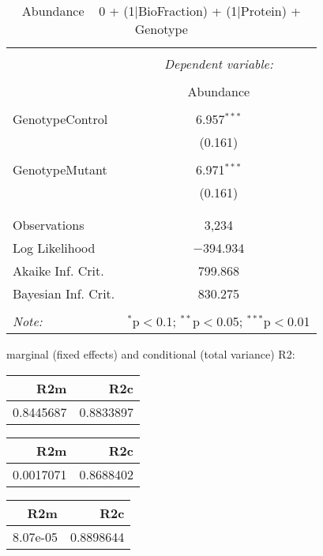 \documentclass[11pt]{report}
\begin{document}
\begin{table}[!htbp] \centering 
  \caption{Abundance ~ 0 + (1|BioFraction) + (1|Protein) + Genotype} 
  \label{} 
\begin{tabular}{@{\extracolsep{5pt}}lc} 
\\[-1.8ex]\hline 
\hline \\[-1.8ex] 
 & \multicolumn{1}{c}{\textit{Dependent variable:}} \\ 
\cline{2-2} 
\\[-1.8ex] & Abundance \\ 
\hline \\[-1.8ex] 
 GenotypeControl & 6.957$^{***}$ \\ 
  & (0.161) \\ 
  & \\ 
 GenotypeMutant & 6.971$^{***}$ \\ 
  & (0.161) \\ 
  & \\ 
\hline \\[-1.8ex] 
Observations & 3,234 \\ 
Log Likelihood & $-$394.934 \\ 
Akaike Inf. Crit. & 799.868 \\ 
Bayesian Inf. Crit. & 830.275 \\ 
\hline 
\hline \\[-1.8ex] 
\textit{Note:}  & \multicolumn{1}{r}{$^{*}$p$<$0.1; $^{**}$p$<$0.05; $^{***}$p$<$0.01} \\ 
\end{tabular} 
\end{table} 
marginal (fixed effects) and conditional (total variance) R2:

\begin{tabular}{r|r}
\hline
R2m & R2c\\
\hline
0.8445687 & 0.8833897\\
\hline
\end{tabular}

\begin{tabular}{r|r}
\hline
R2m & R2c\\
\hline
0.0017071 & 0.8688402\\
\hline
\end{tabular}

\begin{tabular}{r|r}
\hline
R2m & R2c\\
\hline
8.07e-05 & 0.8898644\\
\hline
\end{tabular}
\end{document}
